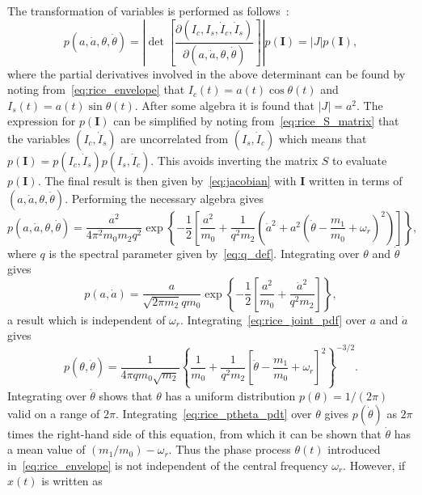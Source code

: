 \documentclass[12pt]{article}
\theoremstyle{plain}
\theoremstyle{definition}
\theoremstyle{remark}
\begin{document}
The transformation of variables is performed as follows~\cite{nigam1983}:
\begin{equation}
    p(a, \dot{a}, \theta, \dot{\theta}) = \left| \det \left[ \frac{\partial (I_c, I_s, \dot{I}_c, \dot{I}_s)}{\partial (a, \dot{a}, \theta, \dot{\theta})} \right] \right| p(\mathbf{I}) = |J| p(\mathbf{I}),
    \label{eq:jacobian}
\end{equation}
where the partial derivatives involved in the above determinant can be found by noting from~\eqref{eq:rice_envelope} that $I_c(t) = a(t) \cos \theta(t)$ and $I_s(t) = a(t) \sin \theta(t)$. After some algebra it is found that $|J| = a^2$. The expression for $p(\mathbf{I})$ can be simplified by noting from~\eqref{eq:rice_S_matrix} that the variables $(I_c, \dot{I}_s)$ are uncorrelated from $(I_s, \dot{I}_c)$ which means that $p(\mathbf{I}) = p(I_c, \dot{I}_s) p(I_s, \dot{I}_c)$. This avoids inverting the matrix $S$ to evaluate $p(\mathbf{I})$. The final result is then given by~\eqref{eq:jacobian} with $\mathbf{I}$ written in terms of $(a, \dot{a}, \theta, \dot{\theta})$. Performing the necessary algebra gives
\begin{equation}
    p(a, \dot{a}, \theta, \dot{\theta}) = \frac{a^2}{4\pi^2 m_0 m_2 q^2} \exp \left\{ -\frac{1}{2} \left[ \frac{a^2}{m_0} + \frac{1}{q^2 m_2} \left( \dot{a}^2 + a^2 \left( \dot{\theta} - \frac{m_1}{m_0} + \omega_r \right)^2 \right) \right] \right\},
    \label{eq:rice_joint_pdf}
\end{equation}
where $q$ is the spectral parameter given by~\eqref{eq:q_def}. Integrating over $\theta$ and $\dot{\theta}$ gives
\begin{equation}
    p(a, \dot{a}) = \frac{a}{\sqrt{2\pi m_2} q m_0} \exp \left\{ -\frac{1}{2} \left[ \frac{a^2}{m_0} + \frac{\dot{a}^2}{q^2 m_2} \right] \right\},
    \label{eq:rice_pa_pda}
\end{equation}
a result which is independent of $\omega_r$. Integrating~\eqref{eq:rice_joint_pdf} over $a$ and $\dot{a}$ gives
\begin{equation}
    p(\theta, \dot{\theta}) = \frac{1}{4\pi q m_0 \sqrt{m_2}} \left\{ \frac{1}{m_0} + \frac{1}{q^2 m_2} \left[ \dot{\theta} - \frac{m_1}{m_0} + \omega_r \right]^2 \right\}^{-3/2}.
    \label{eq:rice_ptheta_pdt}
\end{equation}
Integrating over $\dot{\theta}$ shows that $\theta$ has a uniform distribution $p(\theta) = 1/(2\pi)$ valid on a range of $2\pi$. Integrating~\eqref{eq:rice_ptheta_pdt} over $\theta$ gives $p(\dot{\theta})$ as $2\pi$ times the right-hand side of this equation, from which it can be shown that $\dot{\theta}$ has a mean value of $(m_1/m_0) - \omega_r$. Thus the phase process $\theta(t)$ introduced in~\eqref{eq:rice_envelope} is not independent of the central frequency $\omega_r$. However, if $x(t)$ is written as
\end{document}
